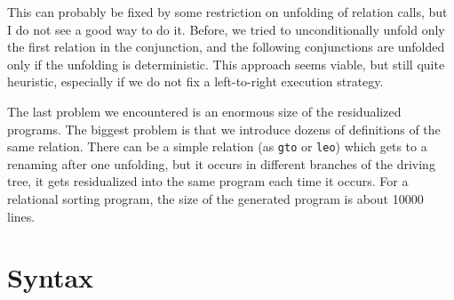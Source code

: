 \documentclass{llncs}
\begin{document}
This can probably be fixed by some restriction on unfolding of relation calls, but I do not see a good way to do it. Before, we tried to unconditionally unfold only the first relation in the conjunction, and the following conjunctions are unfolded only if the unfolding is deterministic. This approach seems viable, but still quite heuristic, especially if we do not fix a left-to-right execution strategy. 


The last problem we encountered is an enormous size of the residualized programs. The biggest problem is that we introduce dozens of definitions of the same relation. There can be a simple relation (as \verb!gto! or \verb!leo!) which gets to a renaming after one unfolding, but it occurs in different branches of the driving tree, it gets residualized into the same program each time it occurs. For a relational sorting program, the size of the generated program is about 10000 lines. 

\newpage

\section{Syntax}
\end{document}
